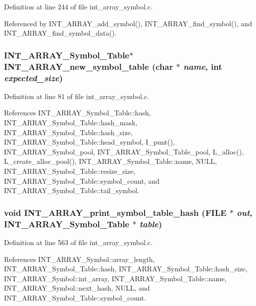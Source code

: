 Definition at line 244 of file int\_\-array\_\-symbol.c.

Referenced by INT\_\-ARRAY\_\-add\_\-symbol(), INT\_\-ARRAY\_\-find\_\-symbol(), and INT\_\-ARRAY\_\-find\_\-symbol\_\-data().
\subsubsection{\setlength{\rightskip}{0pt plus 5cm}\bf{INT\_\-ARRAY\_\-Symbol\_\-Table}$\ast$ INT\_\-ARRAY\_\-new\_\-symbol\_\-table (char $\ast$ {\em name}, int {\em expected\_\-size})}\label{int__array__symbol_8c_2b063d070049ca7e1b3ac6be348c853e}




Definition at line 81 of file int\_\-array\_\-symbol.c.

References INT\_\-ARRAY\_\-Symbol\_\-Table::hash, INT\_\-ARRAY\_\-Symbol\_\-Table::hash\_\-mask, INT\_\-ARRAY\_\-Symbol\_\-Table::hash\_\-size, INT\_\-ARRAY\_\-Symbol\_\-Table::head\_\-symbol, I\_\-punt(), INT\_\-ARRAY\_\-Symbol\_\-pool, INT\_\-ARRAY\_\-Symbol\_\-Table\_\-pool, L\_\-alloc(), L\_\-create\_\-alloc\_\-pool(), INT\_\-ARRAY\_\-Symbol\_\-Table::name, NULL, INT\_\-ARRAY\_\-Symbol\_\-Table::resize\_\-size, INT\_\-ARRAY\_\-Symbol\_\-Table::symbol\_\-count, and INT\_\-ARRAY\_\-Symbol\_\-Table::tail\_\-symbol.
\subsubsection{\setlength{\rightskip}{0pt plus 5cm}void INT\_\-ARRAY\_\-print\_\-symbol\_\-table\_\-hash (FILE $\ast$ {\em out}, \bf{INT\_\-ARRAY\_\-Symbol\_\-Table} $\ast$ {\em table})}\label{int__array__symbol_8c_7a116ef020a0f1a30fb83bcab59f6397}




Definition at line 563 of file int\_\-array\_\-symbol.c.

References INT\_\-ARRAY\_\-Symbol::array\_\-length, INT\_\-ARRAY\_\-Symbol\_\-Table::hash, INT\_\-ARRAY\_\-Symbol\_\-Table::hash\_\-size, INT\_\-ARRAY\_\-Symbol::int\_\-array, INT\_\-ARRAY\_\-Symbol\_\-Table::name, INT\_\-ARRAY\_\-Symbol::next\_\-hash, NULL, and INT\_\-ARRAY\_\-Symbol\_\-Table::symbol\_\-count.

